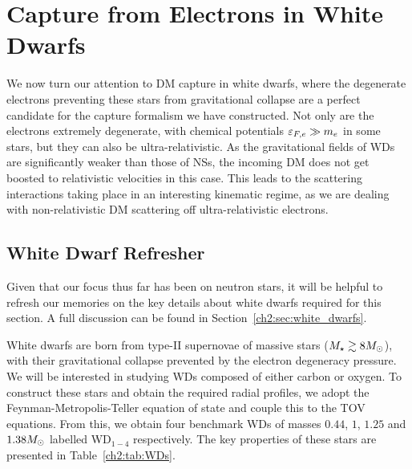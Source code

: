 \section{Capture from Electrons in White Dwarfs}
\label{ch4:sec:capture_WDs}

We now turn our attention to DM capture in white dwarfs, where the degenerate electrons preventing these stars from gravitational collapse are a perfect candidate for the capture formalism we have constructed. Not only are the electrons extremely degenerate, with chemical potentials $\varepsilon_{F,e} \gg m_e$ in some stars, but they can also be ultra-relativistic. As the gravitational fields of WDs are significantly weaker than those of NSs, the incoming DM does not get boosted to relativistic velocities in this case. This leads to the scattering interactions taking place in an interesting kinematic regime, as we are dealing with non-relativistic DM scattering off ultra-relativistic electrons.


\subsection{White Dwarf Refresher}
\label{ch4:subsec:WD_refresh}

Given that our focus thus far has been on neutron stars, it will be helpful to refresh our memories on the key details about white dwarfs required for this section. A full discussion can be found in Section~\ref{ch2:sec:white_dwarfs}. 

White dwarfs are born from type-II supernovae of massive stars ($M_\star\gtrsim 8 M_\odot$), with their gravitational collapse prevented by the electron degeneracy pressure.
We will be interested in studying WDs composed of either carbon or oxygen. To construct these stars and obtain the required radial profiles, we adopt the Feynman-Metropolis-Teller equation of state and couple this to the TOV equations. From this, we obtain four benchmark WDs of masses $0.44$, $1$, $1.25$ and $1.38M_\odot$ labelled WD$_{1-4}$ respectively. The key properties of these stars are presented in Table~\ref{ch2:tab:WDs}.

